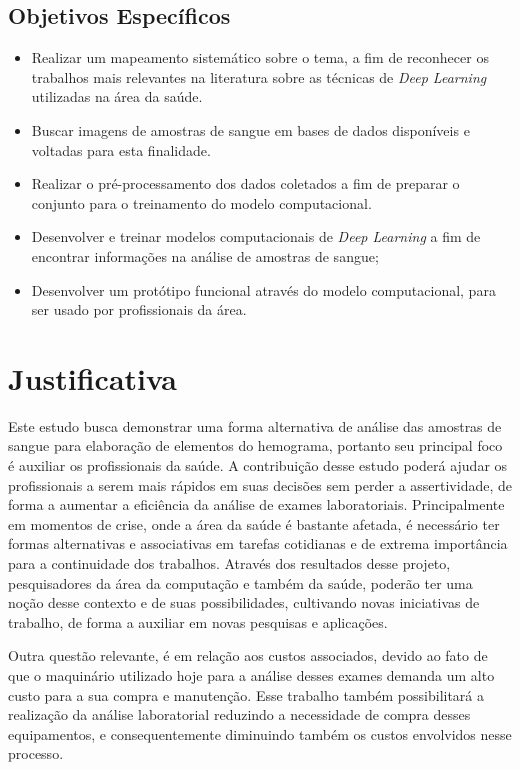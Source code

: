 \subsection{Objetivos Específicos}
\begin{itemize}
    \item Realizar um mapeamento sistemático sobre o tema, a fim de reconhecer os trabalhos mais relevantes na literatura sobre as técnicas de \emph{Deep Learning} utilizadas na área da saúde.
    \item Buscar imagens de amostras de sangue em bases de dados disponíveis e voltadas para esta finalidade.
    \item Realizar o pré-processamento dos dados coletados a fim de preparar o conjunto para o treinamento do modelo computacional.
    \item Desenvolver e treinar modelos computacionais de \emph{Deep Learning} a fim de encontrar informações na análise de amostras de sangue;
    \item Desenvolver um protótipo funcional através do modelo computacional, para ser usado por profissionais da área.
\end{itemize}

\section{Justificativa}
\label{sec:justificativa}
Este estudo busca demonstrar uma forma alternativa de análise das amostras de sangue para elaboração de elementos do hemograma, portanto seu principal foco é auxiliar os profissionais da saúde. A contribuição desse estudo poderá ajudar os profissionais a serem mais rápidos em suas decisões sem perder a assertividade, de forma a aumentar a eficiência da análise de exames laboratoriais. Principalmente em momentos de crise, onde a área da saúde é bastante afetada, é necessário ter formas alternativas e associativas em tarefas cotidianas e de extrema importância para a continuidade dos trabalhos. Através dos resultados desse projeto, pesquisadores da área da computação e também da saúde, poderão ter uma noção desse contexto e de suas possibilidades, cultivando novas iniciativas de trabalho, de forma a auxiliar em novas pesquisas e aplicações.

Outra questão relevante, é em relação aos custos associados, devido ao fato de que o maquinário utilizado hoje para a análise desses exames demanda um alto custo para a sua compra e manutenção. Esse trabalho também possibilitará a realização da análise laboratorial reduzindo a necessidade de compra desses equipamentos, e consequentemente diminuindo também os custos envolvidos nesse processo.

